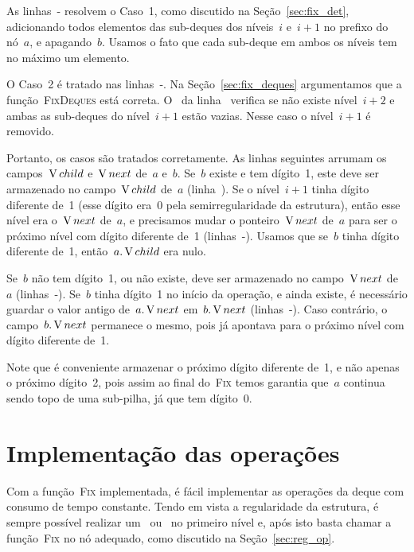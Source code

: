 \documentclass[main.tex]{subfiles}
\begin{document}
As linhas~{-} resolvem o Caso~1, como discutido na Seção~\ref{sec:fix_det}, adicionando todos elementos das sub-deques dos níveis~$i$ e~$i+1$ no prefixo do nó~$a$, e apagando~$b$. Usamos o fato que cada sub-deque em ambos os níveis tem no máximo um elemento.

O Caso~2 é tratado nas linhas~{-}. Na Seção~\ref{sec:fix_deques} argumentamos que a função~\textsc{FixDeques} está correta. O~ da linha~ verifica se não existe nível~$i+2$ e ambas as sub-deques do nível~$i+1$ estão vazias. Nesse caso o nível~$i+1$ é removido.

Portanto, os casos são tratados corretamente. As linhas seguintes arrumam os campos~$\operatorname{V}{child}$ e~$\operatorname{V}{next}$ de~$a$ e~$b$. Se~$b$ existe e tem dígito~1, este deve ser armazenado no campo~$\operatorname{V}{child}$ de~$a$ (linha~). Se o nível~$i+1$ tinha dígito diferente de~1 (esse dígito era~0 pela semirregularidade da estrutura), então esse nível era o~$\operatorname{V}{next}$ de~$a$, e precisamos mudar o ponteiro~$\operatorname{V}{next}$ de~$a$ para ser o próximo nível com dígito diferente de~1 (linhas~-). Usamos que se~$b$ tinha dígito diferente de~1, então~$a.\operatorname{V}{child}$ era nulo.

Se~$b$ não tem dígito~1, ou não existe, deve ser armazenado no campo~$\operatorname{V}{next}$ de~$a$ (linhas~-).
Se~$b$ tinha dígito~1 no início da operação, e ainda existe, é necessário guardar o valor antigo de~$a.\operatorname{V}{next}$ em~$b.\operatorname{V}{next}$ (linhas~-). Caso contrário, o campo~$b.\operatorname{V}{next}$ permanece o mesmo, pois já apontava para o próximo nível com dígito diferente de~1.

Note que é conveniente armazenar o próximo dígito diferente de~1, e não apenas o próximo dígito~2, pois assim ao final do~\textsc{Fix} temos garantia que~$a$ continua sendo topo de uma sub-pilha, já que tem dígito~0.

\section{Implementação das operações}

Com a função~\textsc{Fix} implementada, é fácil implementar as operações da deque com consumo de tempo constante. Tendo em vista a regularidade da estrutura, é sempre possível realizar um~ ou~ no primeiro nível e, após isto basta chamar a função~\textsc{Fix} no nó adequado, como discutido na Seção~\ref{sec:reg_op}.
\end{document}
